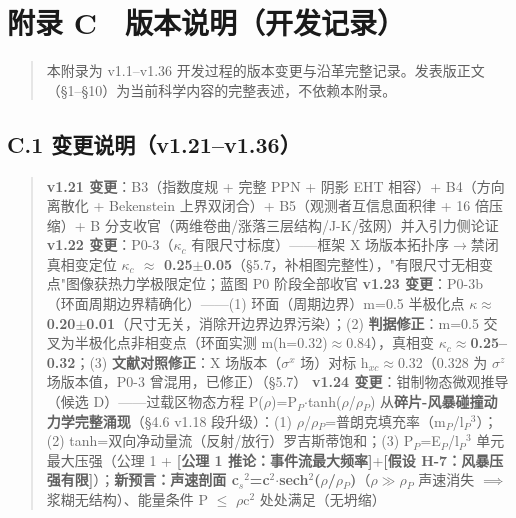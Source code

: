 \documentclass[UTF8,fontset=windows]{csoarticle}
\newcommand{\mtag}[1]{\textbf{[#1]}}
\newcommand{\up}[1]{\ensuremath{^{#1}}}
\newcommand{\down}[1]{\ensuremath{_{#1}}}
\begin{document}
\section*{附录 C　版本说明（开发记录）}

\begin{quote}
本附录为 v1.1--v1.36 开发过程的版本变更与沿革完整记录。发表版正文（\S{}1--\S{}10）为当前科学内容的完整表述，不依赖本附录。
\end{quote}

\subsection*{C.1 变更说明（v1.21--v1.36）}

\begin{quote}
\textbf{v1.21 变更}：B3（指数度规 + 完整 PPN + 阴影 EHT 相容）+ B4（方向离散化 + Bekenstein 上界双闭合）+ B5（观测者互信息面积律 + 16 倍压缩）+ B 分支收官（两维卷曲/涨落三层结构/J-K/弦网）并入引力侧论证
\textbf{v1.22 变更}：P0-3（\ensuremath{\kappa}\down{c} 有限尺寸标度）------框架 X 场版本拓扑序\ensuremath{\to}禁闭真相变定位 \textbf{\ensuremath{\kappa}\down{c} \ensuremath{\approx} 0.25\ensuremath{\pm}0.05}（\S{}5.7，补相图完整性），"有限尺寸无相变点"图像获热力学极限定位；蓝图 P0 阶段全部收官
\textbf{v1.23 变更}：P0-3b（环面周期边界精确化）------(1) 环面（周期边界）m=0.5 半极化点 \textbf{\ensuremath{\kappa}\*\ensuremath{\approx}0.20\ensuremath{\pm}0.01}（尺寸无关，消除开边界边界污染）；(2) \textbf{判据修正}：m=0.5 交叉为半极化点非相变点（环面实测 m(h=0.32)\ensuremath{\approx}0.84），真相变 \textbf{\ensuremath{\kappa}\down{c}\ensuremath{\approx}0.25--0.32}；(3) \textbf{文献对照修正}：X 场版本（\ensuremath{\sigma}\up{x} 场）对标 h\down{xc}\ensuremath{\approx}0.32（0.328 为 \ensuremath{\sigma}\up{z} 场版本值，P0-3 曾混用，已修正）（\S{}5.7）
\textbf{v1.24 变更}：钳制物态微观推导（候选 D）------过载区物态方程 P(\ensuremath{\rho})=P\down{P}\ensuremath{\cdot}tanh(\ensuremath{\rho}/\ensuremath{\rho}\down{P}) 从\textbf{碎片-风暴碰撞动力学完整涌现}（\S{}4.6 v1.18 段升级）：(1) \ensuremath{\rho}/\ensuremath{\rho}\down{P}=普朗克填充率（m\down{P}/l\down{P}\up{3}）；(2) tanh=双向净动量流（反射/放行）罗吉斯蒂饱和；(3) P\down{P}=E\down{P}/l\down{P}\up{3} 单元最大压强（公理 1 + \mtag{公理 1 推论：事件流最大频率}+\mtag{假设 H-7：风暴压强有限}）；\textbf{新预言：声速剖面 c\down{s}\up{2}=c\up{2}\ensuremath{\cdot}sech\up{2}(\ensuremath{\rho}/\ensuremath{\rho}\down{P})}（\ensuremath{\rho}\ensuremath{\gg}\ensuremath{\rho}\down{P} 声速消失 \ensuremath{\implies} 浆糊无结构）、能量条件 P \ensuremath{\leq} \ensuremath{\rho}c\up{2} 处处满足（无坍缩）

\end{quote}
\end{document}
